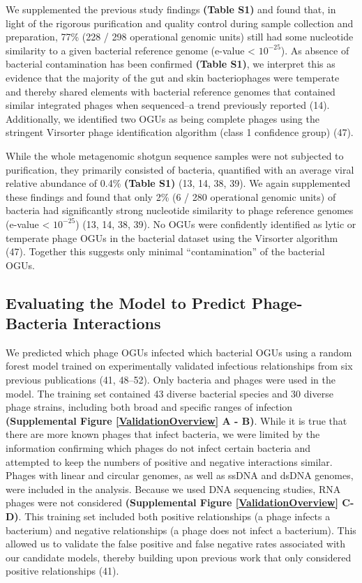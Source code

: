 \documentclass[12pt,]{article}
\begin{document}
We supplemented the previous study findings \textbf{(Table S1)} and
found that, in light of the rigorous purification and quality control
during sample collection and preparation, 77\% (228 / 298 operational
genomic units) still had some nucleotide similarity to a given bacterial
reference genome (e-value \textless{} \(10^{-25}\)). As absence of
bacterial contamination has been confirmed \textbf{(Table S1)}, we
interpret this as evidence that the majority of the gut and skin
bacteriophages were temperate and thereby shared elements with bacterial
reference genomes that contained similar integrated phages when
sequenced--a trend previously reported (14). Additionally, we identified
two OGUs as being complete phages using the stringent Virsorter phage
identification algorithm (class 1 confidence group) (47).

While the whole metagenomic shotgun sequence samples were not subjected
to purification, they primarily consisted of bacteria, quantified with
an average viral relative abundance of 0.4\% \textbf{(Table S1)} (13,
14, 38, 39). We again supplemented these findings and found that only
2\% (6 / 280 operational genomic units) of bacteria had significantly
strong nucleotide similarity to phage reference genomes (e-value
\textless{} \(10^{-25}\)) (13, 14, 38, 39). No OGUs were confidently
identified as lytic or temperate phage OGUs in the bacterial dataset
using the Virsorter algorithm (47). Together this suggests only minimal
``contamination'' of the bacterial OGUs.

\subsection{Evaluating the Model to Predict Phage-Bacteria
Interactions}\label{evaluating-the-model-to-predict-phage-bacteria-interactions}

We predicted which phage OGUs infected which bacterial OGUs using a
random forest model trained on experimentally validated infectious
relationships from six previous publications (41, 48--52). Only bacteria
and phages were used in the model. The training set contained 43 diverse
bacterial species and 30 diverse phage strains, including both broad and
specific ranges of infection \textbf{(Supplemental Figure
\ref{ValidationOverview} A - B)}. While it is true that there are more
known phages that infect bacteria, we were limited by the information
confirming which phages do not infect certain bacteria and attempted to
keep the numbers of positive and negative interactions similar. Phages
with linear and circular genomes, as well as ssDNA and dsDNA genomes,
were included in the analysis. Because we used DNA sequencing studies,
RNA phages were not considered \textbf{(Supplemental Figure
\ref{ValidationOverview} C-D)}. This training set included both positive
relationships (a phage infects a bacterium) and negative relationships
(a phage does not infect a bacterium). This allowed us to validate the
false positive and false negative rates associated with our candidate
models, thereby building upon previous work that only considered
positive relationships (41).
\end{document}
